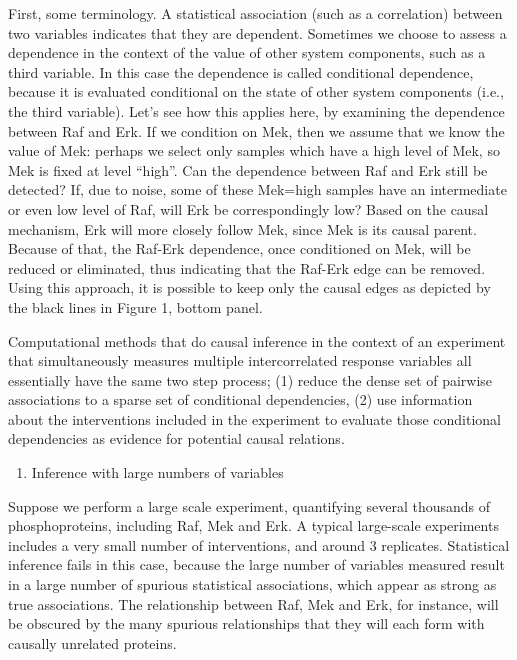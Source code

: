 \documentclass[]{article}
\begin{document}
First, some terminology. A statistical association (such as a
correlation) between two variables indicates that they are dependent.
Sometimes we choose to assess a dependence in the context of the value
of other system components, such as a third variable. In this case the
dependence is called conditional dependence, because it is evaluated
conditional on the state of other system components (i.e., the third
variable). Let's see how this applies here, by examining the dependence
between Raf and Erk. If we condition on Mek, then we assume that we know
the value of Mek: perhaps we select only samples which have a high level
of Mek, so Mek is fixed at level ``high''. Can the dependence between
Raf and Erk still be detected? If, due to noise, some of these Mek=high
samples have an intermediate or even low level of Raf, will Erk be
correspondingly low? Based on the causal mechanism, Erk will more
closely follow Mek, since Mek is its causal parent. Because of that, the
Raf-Erk dependence, once conditioned on Mek, will be reduced or
eliminated, thus indicating that the Raf-Erk edge can be removed. Using
this approach, it is possible to keep only the causal edges as depicted
by the black lines in Figure 1, bottom panel.

Computational methods that do causal inference in the context of an
experiment that simultaneously measures multiple intercorrelated
response variables all essentially have the same two step process; (1)
reduce the dense set of pairwise associations to a sparse set of
conditional dependencies, (2) use information about the interventions
included in the experiment to evaluate those conditional dependencies as
evidence for potential causal relations.

\begin{enumerate}
\def\labelenumi{\Roman{enumi}.}
\setcounter{enumi}{1}
\itemsep1pt\parskip0pt
\item
  Inference with large numbers of variables
\end{enumerate}

Suppose we perform a large scale experiment, quantifying several
thousands of phosphoproteins, including Raf, Mek and Erk. A typical
large-scale experiments includes a very small number of interventions,
and around 3 replicates. Statistical inference fails in this case,
because the large number of variables measured result in a large number
of spurious statistical associations, which appear as strong as true
associations. The relationship between Raf, Mek and Erk, for instance,
will be obscured by the many spurious relationships that they will each
form with causally unrelated proteins.
\end{document}
